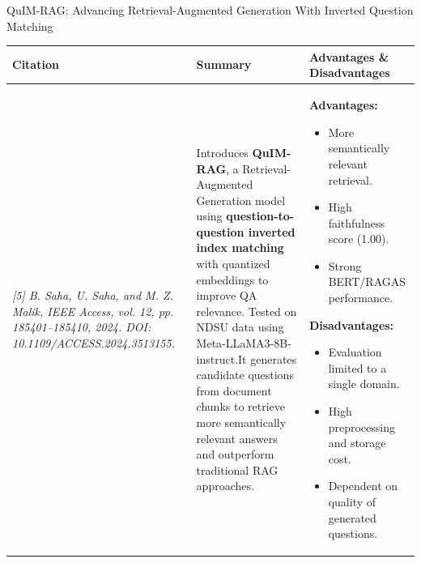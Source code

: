 \begin{frame}{QuIM-RAG: Advancing Retrieval-Augmented Generation With Inverted Question Matching}
\scriptsize
\vspace{-0.8em}

\begin{table}[h!]
\centering
\renewcommand{\arraystretch}{1.5} %
\setlength{\tabcolsep}{2.5pt}     %

\begin{tabular}{|p{2.6cm}|p{4.3cm}|p{4.3cm}|}
\hline
\textbf{Citation} & \textbf{Summary} & \textbf{Advantages \& Disadvantages} \\
\hline
\tiny\textit{[5] B. Saha, U. Saha, and M. Z. Malik, IEEE Access, vol. 12, pp. 185401–185410, 2024.  
DOI: 10.1109/ACCESS.2024.3513155.}
&
Introduces \textbf{QuIM-RAG}, a Retrieval-Augmented Generation model using \textbf{question-to-question inverted index matching} with quantized embeddings to improve QA relevance. Tested on NDSU data using Meta-LLaMA3-8B-instruct.It generates candidate questions from document chunks to retrieve more semantically relevant answers and outperform traditional RAG approaches.
&
\textbf{Advantages:}
\begin{itemize}\itemsep0.25em
\item More semantically relevant retrieval.
\item High faithfulness score (1.00).
\item Strong BERT/RAGAS performance.
\end{itemize}

\textbf{Disadvantages:}
\begin{itemize}\itemsep0.25em
\item Evaluation limited to a single domain.
\item High preprocessing and storage cost.
\item Dependent on quality of generated questions.
\end{itemize} \\
\hline
\end{tabular}
\end{table}
\end{frame}
